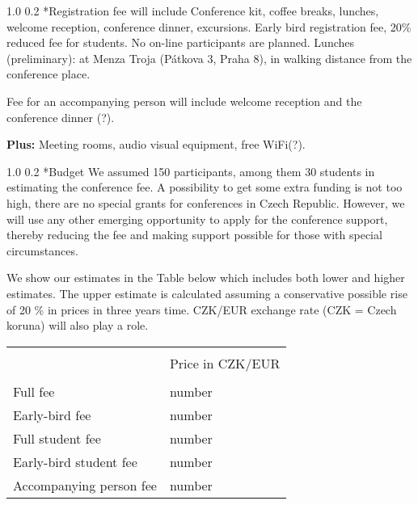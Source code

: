 \documentclass[12pt]{extarticle}
\makeatletter
\renewcommand{\section}{\@startsection{section}{1}{0mm}
{1.0\baselineskip}%
{0.2\baselineskip}%
{\normalfont\large\bfseries}}%
\makeatother
\begin{document}
\section*{Registration fee will include}
\noindent
Conference kit, coffee breaks, lunches, welcome reception, conference dinner, excursions. Early bird registration fee, 20\%
reduced fee for students. No on-line participants are planned.
Lunches (preliminary): at Menza Troja (Pátkova 3, Praha 8), in walking distance from the conference place.

Fee for an accompanying person will include welcome reception and the conference dinner (?).

{\bf Plus:} Meeting rooms,  audio visual equipment,  free WiFi(?).


\section*{Budget}
\noindent
We assumed 150 participants, among them 30 students in estimating the conference fee.
A possibility to  get some extra funding is not too high, there are no special grants for conferences
in Czech Republic. However, we will use any other emerging opportunity to apply for the conference
support, thereby reducing the fee and making support possible for those with special circumstances.

We show our estimates in the Table below which includes both lower and higher estimates. The upper
estimate is calculated assuming a conservative possible rise of 20 \% in prices in three years time.  
CZK/EUR exchange rate (CZK = Czech koruna) will also play a role.

\begin{table}[h]
\centering
\begin{tabular}{ll}
\hline \\[-1mm]
 &   Price in CZK/EUR  \\[1mm]
\hline \\[-1mm]
 Full fee &  number \\[1mm]
 Early-bird fee & number  \\[1mm]
 Full student fee &  number \\[1mm]
 Early-bird student fee & number  \\[1mm]
 Accompanying person fee & number  \\[1mm]
\hline
\end{tabular}
\end{table}
\end{document}
